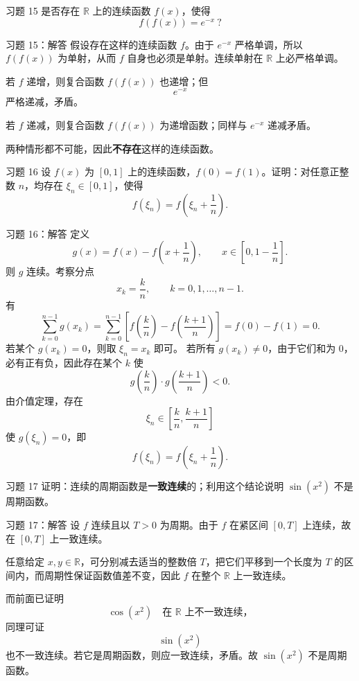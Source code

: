 ﻿\documentclass[aspectratio=169,11pt]{ctexbeamer}
\newcommand{\R}{\mathbb{R}}
\begin{document}
\begin{frame}{习题 15}
是否存在 $\R$ 上的连续函数 $f(x)$，使得
\[
  f(f(x))=e^{-x}\ ?
\]
\end{frame}

\begin{frame}{习题 15：解答}
假设存在这样的连续函数 $f$。由于 $e^{-x}$ 严格单调，所以 $f(f(x))$ 为单射，从而 $f$ 自身也必须是单射。连续单射在 $\R$ 上必严格单调。
\vspace{0.5em}

若 $f$ 递增，则复合函数 $f(f(x))$ 也递增；但
\[
  e^{-x}
\]
严格递减，矛盾。
\vspace{0.5em}

若 $f$ 递减，则复合函数 $f(f(x))$ 为递增函数；同样与 $e^{-x}$ 递减矛盾。
\vspace{0.5em}

两种情形都不可能，因此\textbf{不存在}这样的连续函数。
\end{frame}

\begin{frame}{习题 16}
设 $f(x)$ 为 $[0,1]$ 上的连续函数，$f(0)=f(1)$。证明：对任意正整数 $n$，均存在 $\xi_n\in[0,1]$，使得
\[
  f(\xi_n)=f\!\left(\xi_n+\frac1n\right).
\]
\end{frame}

\begin{frame}[allowframebreaks]{习题 16：解答}
定义
\[
  g(x)=f(x)-f\!\left(x+\frac1n\right),\qquad x\in\left[0,1-\frac1n\right].
\]
则 $g$ 连续。考察分点
\[
  x_k=\frac{k}{n},\qquad k=0,1,\dots,n-1.
\]
有
\[
  \sum_{k=0}^{n-1} g(x_k)
  =
  \sum_{k=0}^{n-1}\left[f\!\left(\frac{k}{n}\right)-f\!\left(\frac{k+1}{n}\right)\right]
  =
  f(0)-f(1)=0.
\]
若某个 $g(x_k)=0$，则取 $\xi_n=x_k$ 即可。  
若所有 $g(x_k)\neq 0$，由于它们和为 $0$，必有正有负，因此存在某个 $k$ 使
\[
  g\!\left(\frac{k}{n}\right)\cdot g\!\left(\frac{k+1}{n}\right)<0.
\]
由介值定理，存在
\[
  \xi_n\in\left[\frac{k}{n},\frac{k+1}{n}\right]
\]
使 $g(\xi_n)=0$，即
\[
  f(\xi_n)=f\!\left(\xi_n+\frac1n\right).
\]
\end{frame}

\begin{frame}{习题 17}
证明：连续的周期函数是\textbf{一致连续}的；利用这个结论说明 $\sin(x^2)$ 不是周期函数。
\end{frame}

\begin{frame}{习题 17：解答}
设 $f$ 连续且以 $T>0$ 为周期。由于 $f$ 在紧区间 $[0,T]$ 上连续，故在 $[0,T]$ 上一致连续。
\vspace{0.5em}

任意给定 $x,y\in\R$，可分别减去适当的整数倍 $T$，把它们平移到一个长度为 $T$ 的区间内，而周期性保证函数值差不变，因此 $f$ 在整个 $\R$ 上一致连续。
\vspace{0.7em}

而前面已证明
\[
  \cos(x^2)
  \quad\text{在 }\R\text{ 上不一致连续，}
\]
同理可证
\[
  \sin(x^2)
\]
也不一致连续。若它是周期函数，则应一致连续，矛盾。故 $\sin(x^2)$ 不是周期函数。
\end{frame}
\end{document}

